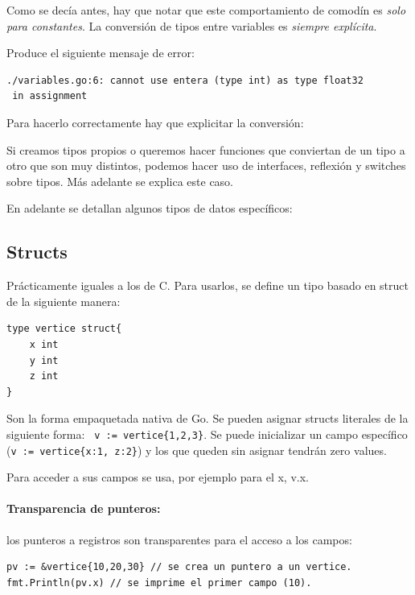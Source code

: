 \documentclass{article}
\begin{document}
Como se decía antes, hay que notar que este comportamiento de comodín es \emph{solo para constantes}. La conversión de tipos entre variables es \emph{siempre explícita}.


Produce el siguiente mensaje de error:
\begin{verbatim}
./variables.go:6: cannot use entera (type int) as type float32
 in assignment
\end{verbatim}
Para hacerlo correctamente hay que explicitar la conversión:


Si creamos tipos propios o queremos hacer funciones que conviertan de un tipo a otro que son muy distintos, podemos hacer uso de interfaces, reflexión y switches sobre tipos. Más adelante %
se explica este caso.

En adelante se detallan algunos tipos de datos específicos:

\subsection{Structs}
Prácticamente iguales a los de C. Para usarlos, se define un tipo basado en struct de la siguiente manera:
\begin{lstlisting}[caption = declaración de structs]
type vertice struct{
	x int
	y int
	z int
}
\end{lstlisting}

Son la forma empaquetada nativa de Go. Se pueden asignar structs literales de la siguiente forma: \lstinline| v := vertice{1,2,3}|. Se puede inicializar un campo específico (\lstinline|v := vertice{x:1, z:2}|) y los que queden sin asignar tendrán zero values.

Para acceder a sus campos se usa, por ejemplo para el x, v.x.

\paragraph{Transparencia de punteros:} los punteros a registros son transparentes para el acceso a los campos:

\begin{lstlisting}[caption = transparencia de punteros.]
pv := &vertice{10,20,30} // se crea un puntero a un vertice.
fmt.Println(pv.x) // se imprime el primer campo (10).
\end{lstlisting}
\end{document}
